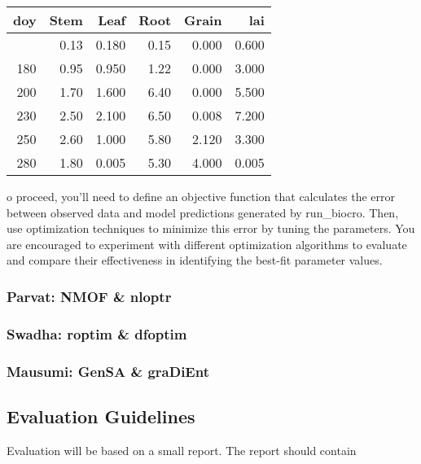 \documentclass[
]{article}
\begin{document}
\begin{longtable}[]{@{}rrrrrr@{}}
\toprule\noalign{}
doy & Stem & Leaf & Root & Grain & lai \\
\midrule\noalign{}
\endhead
\bottomrule\noalign{}
\endlastfoot
160 & 0.13 & 0.180 & 0.15 & 0.000 & 0.600 \\
180 & 0.95 & 0.950 & 1.22 & 0.000 & 3.000 \\
200 & 1.70 & 1.600 & 6.40 & 0.000 & 5.500 \\
230 & 2.50 & 2.100 & 6.50 & 0.008 & 7.200 \\
250 & 2.60 & 1.000 & 5.80 & 2.120 & 3.300 \\
280 & 1.80 & 0.005 & 5.30 & 4.000 & 0.005 \\
\end{longtable}

o proceed, you'll need to define an objective function that calculates
the error between observed data and model predictions generated by
run\_biocro. Then, use optimization techniques to minimize this error by
tuning the parameters. You are encouraged to experiment with different
optimization algorithms to evaluate and compare their effectiveness in
identifying the best-fit parameter values.

\subsubsection{Parvat: NMOF \& nloptr}\label{parvat-nmof-nloptr}

\subsubsection{Swadha: roptim \& dfoptim}\label{swadha-roptim-dfoptim}

\subsubsection{Mausumi: GenSA \& graDiEnt}\label{mausumi-gensa-gradient}

\subsection{Evaluation Guidelines}\label{evaluation-guidelines}

Evaluation will be based on a small report. The report should contain
\end{document}
